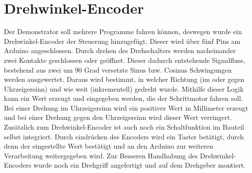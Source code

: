 \section{Drehwinkel-Encoder}
Der Demonstrator soll mehrere Programme fahren können, deswegen wurde ein Drehwinkel-Encoder der Steuerung hinzugefügt. Dieser wird über fünf Pins am Arduino angeschlossen. Durch drehen des Drehschalters werden nacheinander zwei Kontakte geschlossen oder geöffnet. Dieser dadurch entstehende Signalfluss, bestehend aus zwei um 90 Grad versetzte Sinus bzw. Cosinus Schwingungen werden ausgewertet. Daraus wird bestimmt, in welcher Richtung (im oder gegen Uhrzeigersinn) und wie weit (inkrementell) gedreht wurde. Mithilfe dieser Logik kann ein Wert erzeugt und eingegeben werden, die der Schrittmotor fahren soll.\cite{Basler.2016} Bei einer Drehung im Uhrzeigersinn wird ein positiver Wert in Millimeter erzeugt und bei einer Drehung gegen den Uhrzeigersinn wird dieser Wert verringert. Zusätzlich zum Drehwinkel-Encoder ist auch noch ein Schaltfunktion im Bauteil selbst integriert. Durch eindrücken des Encoders wird ein Taster betätigt, durch denn der eingestellte Wert bestätigt und an den Arduino zur weiteren Verarbeitung weitergegeben wird. Zur Besseren Handhabung des Drehwinkel-Encoders wurde noch ein Drehgriff angefertigt und auf dem Drehgeber montiert.
